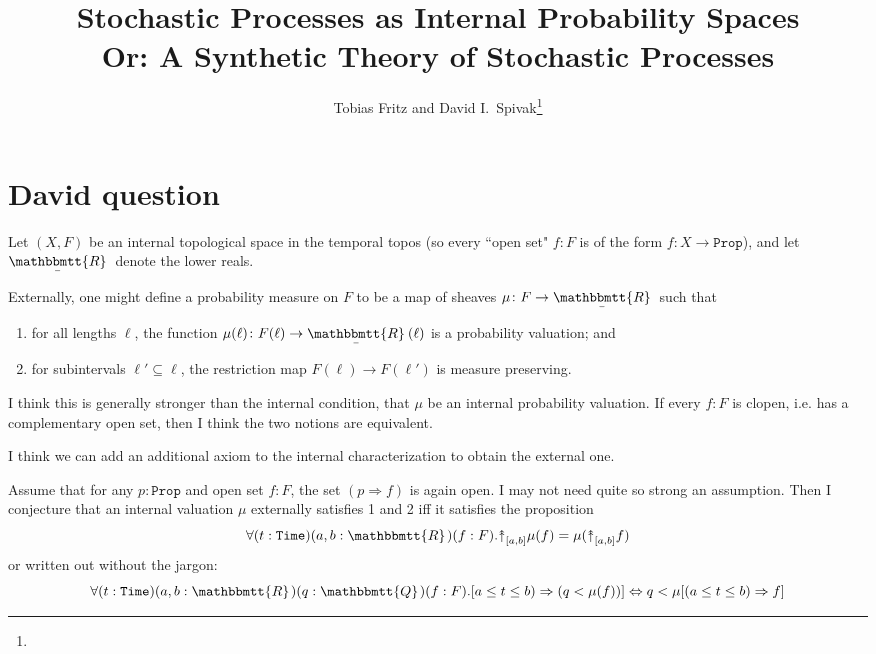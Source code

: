 \documentclass[11pt, oneside, article]{memoir}
\theoremstyle{plain}
\theoremstyle{definition}
\theoremstyle{remark}
\renewcommand{\ss}{\subseteq}
\newcommand{\const}[1]{\mathtt{#1}}
\newcommand{\ubar}[1]{\underaccent{\bar}{#1}}
\newcommand{\internal}[1]{\raisebox{-.03ex}{$\mathbbmtt{#1}$}}
\newcommand{\hs}{\hspace{1.1pt}}
\newcommand{\tQQ}{\internal{Q}\hs}
\newcommand{\tRR}{\internal{R}\hs}
\newcommand{\tLR}{\ubar{\tRR}\hs}
\newcommand{\Prop}{\const{Prop}}
\newcommand{\Time}{\const{Time}}
\newcommand{\InSymbol}{{\upclose}}%
\newcommand{\In}[2][]{\InSymbol^{#1}_{#2}}
\newcommand{\upclose}{{\rotatebox[origin=c]{90}{$\twoheadrightarrow$}}}
\newcommand{\imp}{\Rightarrow}
\renewcommand{\iff}{\Leftrightarrow}
\begin{document}
\title{Stochastic Processes as Internal Probability Spaces\\ Or: A Synthetic Theory of Stochastic Processes}

\author{Tobias Fritz and David I.\ Spivak\thanks{}}

\maketitle


\tableofcontents*



\chapter{David question}
Let $(X,F)$ be an internal topological space in the temporal topos (so every ``open set" $f:F$ is of the form $f\colon X\to \Prop$), and let $\tLR$ denote the lower reals.

Externally, one might define a probability measure on $F$ to be a map of sheaves $\mu\colon F \to \tLR$ such that 
\begin{enumerate}
	\item for all lengths $\ell$, the function $\mu(\ell)\colon F(\ell)\to\tLR(\ell)$ is a probability valuation; and
	\item for subintervals $\ell'\ss\ell$, the restriction map $F(\ell)\to F(\ell')$ is measure preserving.
\end{enumerate}
I think this is generally stronger than the internal condition, that $\mu$ be an internal probability valuation. If every $f:F$ is clopen, i.e. has a complementary open set, then I think the two notions are equivalent. 

I think we can add an additional axiom to the internal characterization to obtain the external one.

Assume that for any $p:\Prop$ and open set $f:F$, the set $(p \imp f)$ is again open. I may not need quite so strong an assumption. Then I conjecture that an internal valuation $\mu$ externally satisfies 1 and 2 iff it satisfies the proposition
\[\forall(t:\Time)(a,b:\tRR)(f:F).\In{[a,b]}\mu(f)=\mu(\In{[a,b]}f)\]
or written out without the jargon:
\[\forall(t:\Time)(a,b:\tRR)(q:\tQQ)(f:F).[a\leq t\leq b)\imp(q<\mu(f))]\iff q<\mu[(a\leq t\leq b)\imp f]
\]
\end{document}
